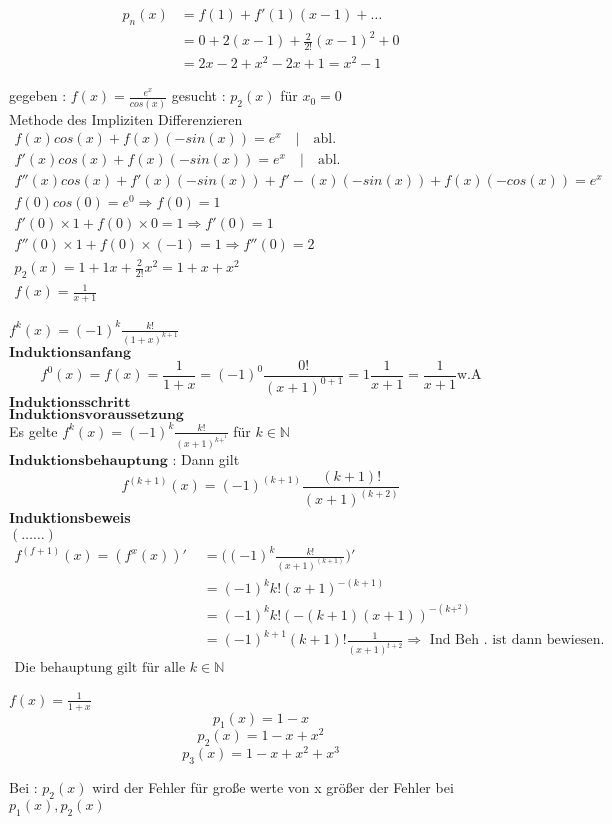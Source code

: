 \begin{align*}
p_n(x)&= f(1) + f'(1)(x-1)+ \dots \\
&= 0 + 2(x-1) + \frac{2}{2!}(x-1)^2 + 0 \\
&= 2x -2 + x^2 -2x +1 = x^2 -1
\end{align*} 

\begin{example}
gegeben : $f(x) = \frac{e^x}{cos(x)}$  gesucht : $p_2(x)$ für $x_0=0$\\
Methode des Impliziten Differenzieren 
\begin{gather*}
f(x) cos(x) + f(x)(-sin(x)) = e^x \quad | \quad \text{abl.} \\
f'(x) cos(x) + f(x)(-sin(x))= e^x \quad | \quad \text{abl.} \\
f''(x)cos(x) + f'(x)(-sin(x))+ f'-(x)(-sin(x)) + f(x)(- cos(x)) = e^x \\
f(0)cos(0) = e^0 \Rightarrow f(0) = 1\\
f'(0)\times 1 + f(0) \times 0 = 1 \Rightarrow f'(0) = 1\\
f''(0)\times 1 + f(0) \times (-1) = 1 \Rightarrow f''(0) = 2\\
p_2(x) = 1 + 1 x + \frac{2}{2!}x^2 = 1 + x + x^2\\
f(x) = \frac{1}{x+1}
\end{gather*}
\end{example}

\begin{example}
$f^k(x) = (-1)^k \frac{k!}{(1+x)^{k+1}}$\\
$\textbf{Induktionsanfang}$ 
\[ f^0(x) = f(x) = \frac{1}{1+x} = (-1)^0 \frac{0!}{(x+1)^{0+1}} = 1 \frac{1}{x+1} = \frac{1}{x+1} \text{w.A}\]
$\textbf{Induktionsschritt}$\\
$\textbf{Induktionsvoraussetzung}$\\
Es gelte $f^k(x)=(-1)^k\frac{k!}{(x +1)^{k+^1}}$ für $k \in \mathbb{N}$\\
$\textbf{Induktionsbehauptung}$ : Dann gilt \\
\[ f^{(k+1)}(x)= (-1)^{(k+1)} \frac{(k+1)!}{(x+1)^{(k+2)}}\]
\textbf{Induktionsbeweis}\\
$(\dots \dots)$\\
\begin{align*}
f^{(f+1)}(x) = (f^x(x))' &= \big((-1)^k \frac{k!}{(x+1)^{(k+1)}}\big )' \\
&= (-1)^k k! (x+1)^{-(k+1)}\\
&= (-1)^k k! (-(k+1)(x+1))^{-(k+^2)}\\
&= (-1)^{k+1} (k+1)! \frac{1}{(x+1)^{t+2}} \Rightarrow \text{ Ind Beh . ist dann bewiesen. }\\
\text{Die behauptung gilt für alle } k \in \mathbb{N}
\end{align*}
\end{example}
\begin{example}
$f(x)= \frac{1}{1+x}$ 
\[ p_1(x) = 1-x \]
\[ p_2(x) = 1-x + x^2 \]
\[ p_3(x) = 1-x+x^2+x^3 \]
\end{example}
\begin{remark}
Bei : $p_2(x)$ wird der Fehler für große werte von x größer der Fehler bei $p_1(x) , p_2(x)$
\end{remark}
